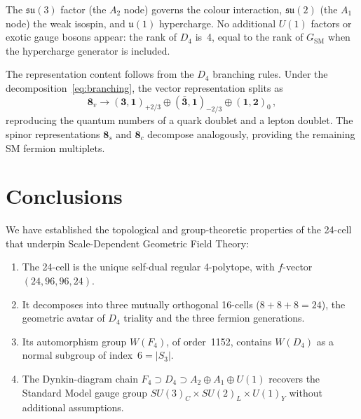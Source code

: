 \documentclass[amsmath,amssymb,aps,prd,twocolumn,superscriptaddress,nofootinbib]{revtex4-2}
\begin{document}
The $\mathfrak{su}(3)$ factor (the $A_2$ node) governs the colour interaction,
$\mathfrak{su}(2)$ (the $A_1$ node) the weak isospin, and $\mathfrak{u}(1)$
hypercharge.  No additional $U(1)$ factors or exotic gauge bosons appear: the
rank of $D_4$ is~4, equal to the rank of $G_{\mathrm{SM}}$ when the
hypercharge generator is included.

The representation content follows from the $D_4$ branching rules.  Under the
decomposition~\eqref{eq:branching}, the vector representation splits as
\begin{equation}\label{eq:8v_decomp}
  \mathbf{8}_v \to (\mathbf{3},\mathbf{1})_{+2/3}
               \oplus (\bar{\mathbf{3}},\mathbf{1})_{-2/3}
               \oplus (\mathbf{1},\mathbf{2})_0\,,
\end{equation}
reproducing the quantum numbers of a quark doublet and a lepton doublet.  The
spinor representations $\mathbf{8}_s$ and $\mathbf{8}_c$ decompose analogously,
providing the remaining SM fermion multiplets.

\section{Conclusions}\label{sec:conclusions}

We have established the topological and group-theoretic properties of the
24-cell that underpin Scale-Dependent Geometric Field Theory:

\begin{enumerate}
  \item The 24-cell is the unique self-dual regular 4-polytope, with
    $f$-vector $(24,96,96,24)$.

  \item It decomposes into three mutually orthogonal 16-cells
    ($8+8+8=24$), the geometric avatar of $D_4$ triality and the three
    fermion generations.

  \item Its automorphism group $W(F_4)$, of order~1152, contains $W(D_4)$
    as a normal subgroup of index~$6 = |S_3|$.

  \item The Dynkin-diagram chain $F_4 \supset D_4 \supset
    A_2 \oplus A_1 \oplus U(1)$ recovers the Standard Model gauge group
    $SU(3)_C \times SU(2)_L \times U(1)_Y$ without additional assumptions.
\end{enumerate}
\end{document}
